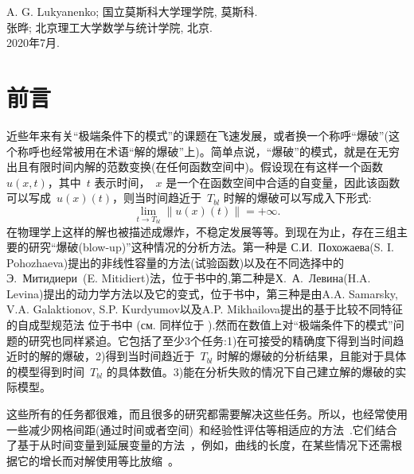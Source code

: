 \documentclass[twoside]{book}
\begin{document}
\begin{CJK*}{GBK}{song}
\bigskip

\begin{flushright}
A. G. Lukyanenko; 国立莫斯科大学理学院, 莫斯科.\\
张晔; 北京理工大学数学与统计学院, 北京.\\
2020年7月.
\end{flushright}

\tableofcontents
\listoffigures
\listoftables


\newpage
{}



\chapter*{前言}\label{chapter0}


近些年来有关“极端条件下的模式”的课题在飞速发展，或者换一个称呼“爆破”(这个称呼也经常被用在术语“解的爆破”上)。简单点说，“爆破”的模式，就是在无穷出且有限时间内解的范数变换(在任何函数空间中)。假设现在有这样一个函数~$u(x,t)$，其中~$t$ 表示时间，~$x$ 是一个在函数空间中合适的自变量，因此该函数可以写成~$u(x)(t)$，则当时间趋近于~$T_{bl}$ 时解的爆破可以写成入下形式:
\begin{equation*}
\lim_{t\to T_{bl}}\|u(x)(t)\|=+\infty.
\end{equation*}
在物理学上这样的解也被描述成爆炸，不稳定发展等等。到现在为止，存在三组主要的研究“爆破(blow-up)”这种情况的分析方法。第一种是 С.\;И.~Похожаева(S. I. Pohozhaeva)提出的非线性容量的方法(试验函数)以及在不同选择中的Э.~Митидиери~(E. Mitidiert)法，位于书中的\cite{Po},第二种是Х.~А.~Левина(H.A. Levina)提出的动力学方法以及它的变式，位于书中\cite{Levine1, Levine2,Kal, Al, Korpusov}，第三种是由A.A. Samarsky, V.A. Galaktionov, S.P. Kurdyumov以及A.P. Mikhailova提出的基于比较不同特征的自成型规范法 位于书中\cite{Samar} (см. 同样位于 \cite{Galact}).然而在数值上对“极端条件下的模式”问题的研究也同样紧迫。它包括了至少3个任务:1)在可接受的精确度下得到当时间趋近时的解的爆破，2)得到当时间趋近于~$T_{bl}$ 时解的爆破的分析结果，且能对于具体的模型得到时间~$T_{bl}$ 的具体数值。3)能在分析失败的情况下自己建立解的爆破的实际模型。

这些所有的任务都很难，而且很多的研究都需要解决这些任务。所以，也经常使用一些减少网格间距(通过时间或者空间)~\cite{PelXu, Georg}和经验性评估等相适应的方法~\cite{Georg}.它们结合了基于从时间变量到延展变量的方法~\cite{Turner}，例如，曲线的长度，在某些情况下还需根据它的增长而对解使用等比放缩~\cite{BerKohn}。


\end{CJK*}
\end{document}
